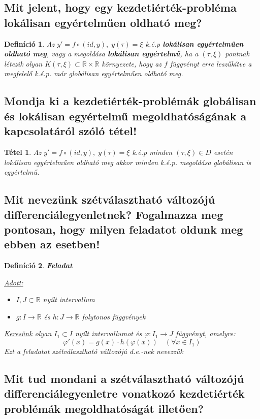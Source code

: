 \documentclass[12pt,a4paper]{article}
\newcommand{\R}{\mathbb{R}}
\newcommand{\f}{\varphi}
\newcommand{\bb}[1]{\left( #1 \right)}
\newtheorem{tet}{Tétel}[section]
\newtheorem{defi}{Definíció}[section]
\begin{document}
\subsection{Mit jelent, hogy egy kezdetiérték-probléma lokálisan egyértelműen oldható meg?}
\begin{defi}
Az $y' = f \circ \bb{id,y}, \; y(\tau) = \xi$ k.é.p \textbf{lokálisan egyértelműen oldható meg}, vagy a megoldása \textbf{lokálisan egyértelmű}, ha a $\bb{\tau,\xi}$ pontnak létezik olyan $K(\tau,\xi) \subset \R \times \R$ környezete, hogy az $f$ függvényt erre leszűkítve a megfelelő k.é.p. már globálisan egyértelműen oldható meg.
\end{defi}
\subsection{Mondja ki a kezdetiérték-problémák globálisan és lokálisan egyértelmű megoldhatóságának a kapcsolatáról szóló tétel!}
\begin{tet}
Az $y' = f \circ \bb{id,y}, \; y(\tau) = \xi$ k.é.p minden $\bb{\tau,\xi} \in D$ esetén lokálisan egyértelműen oldható meg akkor minden k.é.p. megoldása globálisan is egyértelmű.
\end{tet}
\subsection{Mit nevezünk szétválasztható változójú differenciálegyenletnek? Fogalmazza meg pontosan, hogy milyen feladatot oldunk meg ebben az esetben!}
\begin{defi}
\textbf{Feladat}

\underline{Adott:} \begin{itemize}
\item $I,J \subset \R$ nyílt intervallum
\item $g:I \to \R$ és $h:J\to \R$ folytonos függvények
\end{itemize}
\underline{Keresünk} olyan $I_1 \subset I$ nyílt intervallumot és $\f : I_1 \to J$ függvényt, amelyre:
\[
\f'(x) = g(x) \cdot h(\f(x)) \quad (\forall x \in I_1)
\]
Ezt a feladatot szétválasztható változójú d.e.-nek nevezzük
\end{defi}
\subsection{Mit tud mondani a szétválasztható változójú differenciálegyenletre vonatkozó kezdetiérték problémák megoldhatóságát illetően?}
\end{document}
